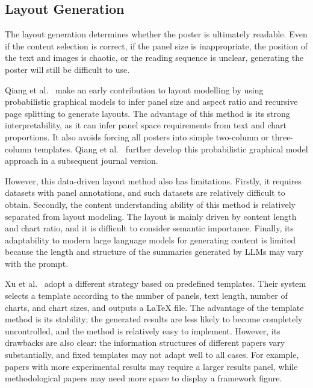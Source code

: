 \documentclass[12pt,oneside]{report}
\begin{document}
\subsection{Layout Generation}

The layout generation determines whether the poster is ultimately readable. Even if the content selection is correct, if the panel size is inappropriate, the position of the text and images is chaotic, or the reading sequence is unclear, generating the poster will still be difficult to use.

\vspace{1em}

Qiang et al.~\cite{poster2016} make an early contribution to layout modelling by using probabilistic graphical models to infer panel size and aspect ratio and recursive page splitting to generate layouts. The advantage of this method is its strong interpretability, as it can infer panel space requirements from text and chart proportions. It also avoids forcing all posters into simple two-column or three-column templates. Qiang et al.~\cite{poster2019} further develop this probabilistic graphical model approach in a subsequent journal version.

\vspace{1em}

However, this data-driven layout method also has limitations. Firstly, it requires datasets with panel annotations, and such datasets are relatively difficult to obtain. Secondly, the content understanding ability of this method is relatively separated from layout modeling. The layout is mainly driven by content length and chart ratio, and it is difficult to consider semantic importance. Finally, its adaptability to modern large language models for generating content is limited because the length and structure of the summaries generated by LLMs may vary with the prompt.

\vspace{1em}

Xu et al.~\cite{posterbot} adopt a different strategy based on predefined templates. Their system selects a template according to the number of panels, text length, number of charts, and chart sizes, and outputs a LaTeX file. The advantage of the template method is its stability; the generated results are less likely to become completely uncontrolled, and the method is relatively easy to implement. However, its drawbacks are also clear: the information structures of different papers vary substantially, and fixed templates may not adapt well to all cases. For example, papers with more experimental results may require a larger results panel, while methodological papers may need more space to display a framework figure.
\end{document}
